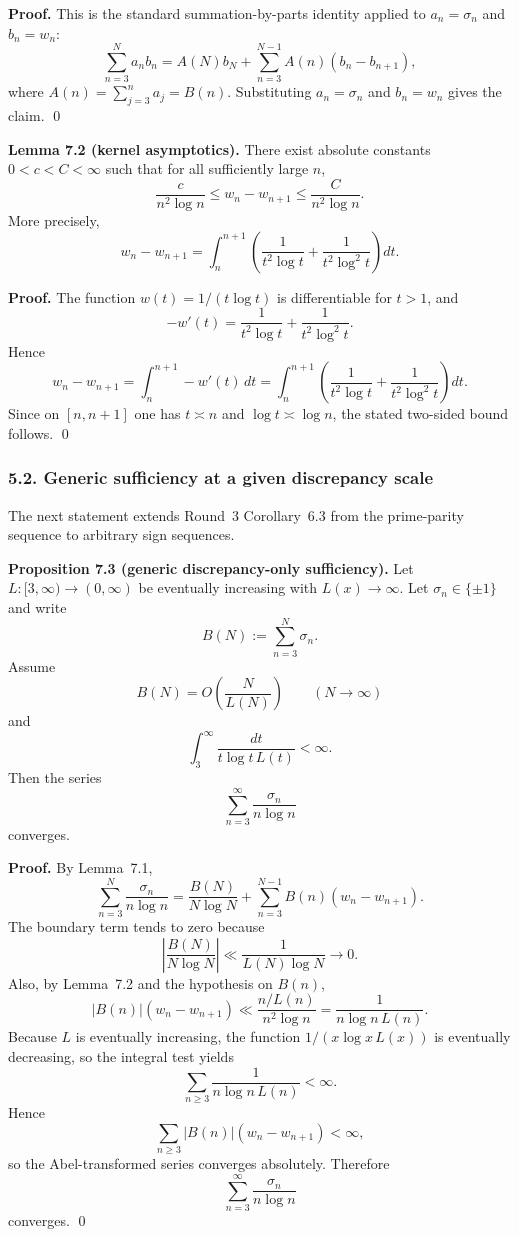 \textbf{Proof.}
This is the standard summation-by-parts identity applied to $a_n=\sigma_n$ and $b_n=w_n$:
\[
\sum_{n=3}^N a_nb_n = A(N)b_N + \sum_{n=3}^{N-1} A(n)(b_n-b_{n+1}),
\]
where $A(n)=\sum_{j=3}^n a_j=B(n)$. Substituting $a_n=\sigma_n$ and $b_n=w_n$ gives the claim. \qed

\medskip

\textbf{Lemma 7.2 (kernel asymptotics).}
There exist absolute constants $0<c<C<\infty$ such that for all sufficiently large $n$,
\[
\frac{c}{n^2\log n}
\le
w_n-w_{n+1}
\le
\frac{C}{n^2\log n}.
\]
More precisely,
\[
w_n-w_{n+1}
=
\int_n^{n+1}\left(\frac{1}{t^2\log t}+\frac{1}{t^2\log^2 t}\right)dt.
\]

\textbf{Proof.}
The function $w(t)=1/(t\log t)$ is differentiable for $t>1$, and
\[
-w'(t)=\frac{1}{t^2\log t}+\frac{1}{t^2\log^2 t}.
\]
Hence
\[
w_n-w_{n+1} = \int_n^{n+1} -w'(t)\,dt
= \int_n^{n+1}\left(\frac{1}{t^2\log t}+\frac{1}{t^2\log^2 t}\right)dt.
\]
Since on $[n,n+1]$ one has $t\asymp n$ and $\log t\asymp \log n$, the stated two-sided bound follows. \qed

\subsubsection*{5.2. Generic sufficiency at a given discrepancy scale}

The next statement extends Round~3 Corollary~6.3 from the prime-parity sequence to arbitrary sign sequences.

\textbf{Proposition 7.3 (generic discrepancy-only sufficiency).}
Let $L:[3,\infty)\to(0,\infty)$ be eventually increasing with $L(x)\to\infty$. Let $\sigma_n\in\{\pm1\}$ and write
\[
B(N):=\sum_{n=3}^N \sigma_n.
\]
Assume
\[
B(N)=O\!\left(\frac{N}{L(N)}\right)
\qquad (N\to\infty)
\]
and
\[
\int_3^\infty \frac{dt}{t\log t\,L(t)}<\infty.
\]
Then the series
\[
\sum_{n=3}^\infty \frac{\sigma_n}{n\log n}
\]
converges.

\textbf{Proof.}
By Lemma~7.1,
\[
\sum_{n=3}^N \frac{\sigma_n}{n\log n}
=
\frac{B(N)}{N\log N}
+
\sum_{n=3}^{N-1} B(n)(w_n-w_{n+1}).
\]
The boundary term tends to zero because
\[
\left|\frac{B(N)}{N\log N}\right|
\ll \frac{1}{L(N)\log N}
\to 0.
\]
Also, by Lemma~7.2 and the hypothesis on $B(n)$,
\[
|B(n)|(w_n-w_{n+1})
\ll
\frac{n/L(n)}{n^2\log n}
=
\frac{1}{n\log n\,L(n)}.
\]
Because $L$ is eventually increasing, the function $1/(x\log x\,L(x))$ is eventually decreasing, so the integral test yields
\[
\sum_{n\ge 3}\frac{1}{n\log n\,L(n)}<\infty.
\]
Hence
\[
\sum_{n\ge 3}|B(n)|(w_n-w_{n+1})<\infty,
\]
so the Abel-transformed series converges absolutely. Therefore
\[
\sum_{n=3}^\infty \frac{\sigma_n}{n\log n}
\]
converges. \qed

